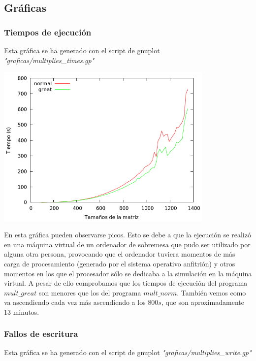 \documentclass[nochap]{apuntes}
\begin{document}
\subsection{Gr\'aficas}
\subsubsection{Tiempos de ejecución}
Esta gráfica se ha generado con el script de gnuplot \emph{"graficas/multiplies\_times.gp"}
\begin{center}
\includegraphics[width=0.8\textwidth]{graficas/fotos/multiplies_times.png}
\end{center}
En esta gráfica pueden observarse picos. Esto se debe a que la ejecución se realizó en una máquina virtual de un ordenador de sobremesa que pudo ser utilizado por alguna otra persona, provocando que el ordenador tuviera momentos de más carga de procesamiento (generado por el sistema operativo anfitrión) y otros momentos en los que el procesador sólo se dedicaba a la simulación en la máquina virtual. A pesar de ello comprobamos que los tiempos de ejecución del programa $mult\_great$ son menores que los del programa $mult\_norm$. También vemos como va ascendiendo cada vez más ascendiendo a los $800s$, que son aproximadamente 13 minutos.


\subsubsection{Fallos de escritura}

Esta gráfica se ha generado con el script de gnuplot \emph{"graficas/multiplies\_write.gp"}
\end{document}
